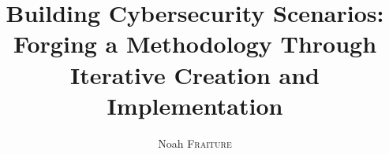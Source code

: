 \documentclass{EPL-master-thesis-covers-EN}
\title{Building Cybersecurity Scenarios: Forging a Methodology Through Iterative Creation and Implementation}
\author{Noah \textsc{Fraiture}}
\begin{document}
  \maketitle

  \backcoverpage
\end{document}
